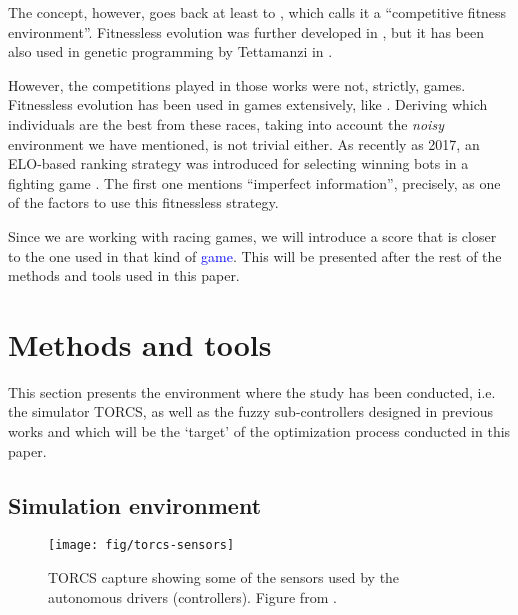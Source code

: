 \documentclass[10pt,journal,compsoc]{IEEEtran}
\begin{document}
The concept, however, goes back at least to
\cite{Angeline:1993:CEE:645513.657590}, which calls it a ``competitive
fitness environment''. Fitnessless evolution was further developed in
\cite{rosin1995methods}, but it has been also used in genetic
programming by Tettamanzi in \cite{tettamanzi1996genetic}.

However, the competitions played in those works were not, strictly,
games. Fitnessless evolution has been used in games extensively, like
\cite{Jaskowski2008,10.1007/978-3-540-78671-9_2,fernandez2016_only_one}.
Deriving which individuals are the best from these races, taking into account
the {\em noisy} environment we have mentioned, is not trivial
either. As recently as 2017, an ELO-based ranking strategy was
introduced for selecting winning bots in a fighting game
\cite{7792145}. The first one mentions ``imperfect information'',
precisely, as one of the factors to use this fitnessless strategy.

Since we are working with racing games, we will introduce a score that
is closer to the one used in that kind of \textcolor{blue}{game}. This will be
presented after the rest of the methods and tools used in this paper. 



\section{Methods and tools}
\label{sec:methods}

This section presents the environment where the study has been conducted, i.e. the simulator TORCS, as well as the fuzzy sub-controllers designed in previous works and which will be the `target' of the optimization process conducted in this paper. 

%

\subsection{Simulation environment}

\begin{figure}[!ht] 
	\begin{center}
		\texttt{[image: fig/torcs-sensors]}
		\caption {TORCS capture showing some of the sensors
                used by the autonomous drivers (controllers). Figure from \cite{DBLP:conf/cig/SalemMG19}.}
		\label{fig:torcs-sensors}
	\end{center}
\end{figure}
\end{document}
